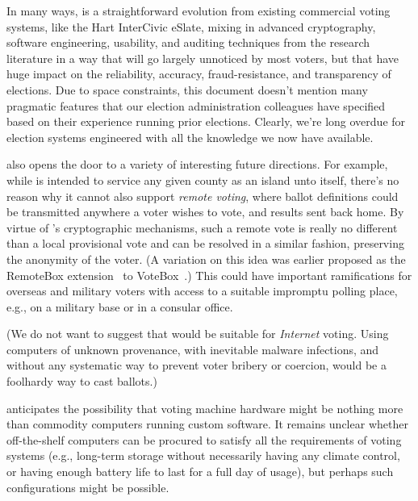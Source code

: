 \label{sec:future}
\label{sec:conclusion}

In many ways, \projname is a straightforward evolution from existing
commercial voting systems, like the Hart InterCivic eSlate, mixing in
advanced cryptography, software engineering, usability, and auditing
techniques from the research literature in a way that will go largely
unnoticed by most voters, but that have huge impact on the
reliability, accuracy, fraud-resistance, and transparency of
elections. Due to space constraints, this document doesn't 
mention many pragmatic features that our election
administration colleagues have specified based on their experience
running prior elections. Clearly, we're long overdue for election
systems engineered with all the knowledge we now have available.

\projname also opens the door to a variety of interesting future
directions. 
For example, while \projname is intended to service any
given county as an island unto itself, there's no reason why it cannot
also support {\em remote voting}, where ballot definitions could be
transmitted anywhere a voter wishes to vote, and results sent back
home. 
By virtue of \projname's cryptographic mechanisms, such a remote
vote is really no different than a local provisional vote and can be
resolved in a similar fashion, preserving the anonymity of the
voter. (A variation on this idea was earlier proposed as the RemoteBox
extension~\cite{remotebox08} to VoteBox~\cite{sandler08votebox}.)
This could have important ramifications for overseas and military
voters with access to a suitable impromptu polling place, e.g., on a
military base or in a consular office.

(We do not want to suggest that \projname
would be suitable for {\em Internet} voting. Using computers of
unknown provenance, with inevitable malware infections, and
without any systematic way to prevent voter bribery or coercion,
would be a foolhardy way to cast ballots.)

\projname anticipates the possibility that voting machine
hardware might be nothing more than commodity computers running custom
software. It remains unclear whether off-the-shelf computers can be
procured to satisfy all the requirements of voting systems (e.g.,
long-term storage without necessarily having any climate control, or
having enough battery life to last for a full day of usage), but
perhaps such configurations might be possible.


